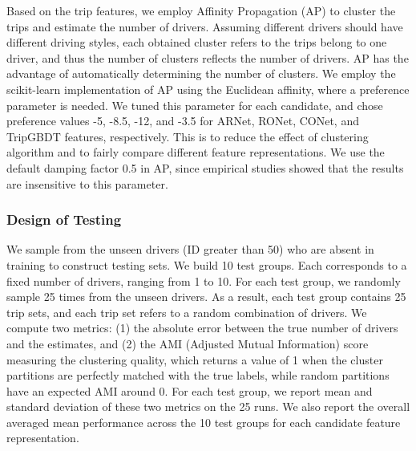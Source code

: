 \documentclass{article}
\begin{document}
Based on the trip features, we employ Affinity Propagation (AP) \cite{frey07affinitypropagation} to cluster the trips and estimate the number of drivers.
Assuming different drivers should have different driving styles, each obtained cluster refers to the trips belong to one driver, and thus the number of clusters reflects the number of drivers.
AP has the advantage of automatically determining the number of clusters.
We employ the scikit-learn implementation of AP \cite{scikit-learn} using the Euclidean affinity, %
where a preference parameter is needed.
We tuned this parameter for each candidate, and chose preference values -5, -8.5, -12, and -3.5 for ARNet, RONet, CONet, and TripGBDT features, respectively.
This is to reduce the effect of clustering algorithm and to fairly compare different feature representations.
We use the default damping factor 0.5 in AP, since empirical studies showed that the results are insensitive to this parameter.


\subsubsection{Design of Testing}
We sample from the unseen drivers (ID greater than 50) who are absent in training to construct testing sets.
We build 10 test groups. Each corresponds to a fixed number of drivers, ranging from 1 to 10.
For each test group, we randomly sample 25 times from the unseen drivers.
As a result, each test group contains 25 trip sets, and each trip set refers to a random combination of drivers.
We compute two metrics: (1) the absolute error between the true number of drivers and the estimates, and (2) the AMI (Adjusted Mutual Information) score \cite{vinh2010information} measuring the clustering quality, which returns a value of 1 when the cluster partitions are perfectly matched with the true labels, while random partitions have an expected AMI around 0.
For each test group, we report mean and standard deviation of these two metrics on the 25 runs.
We also report the overall averaged mean performance across the 10 test groups for each candidate feature representation.
\end{document}
